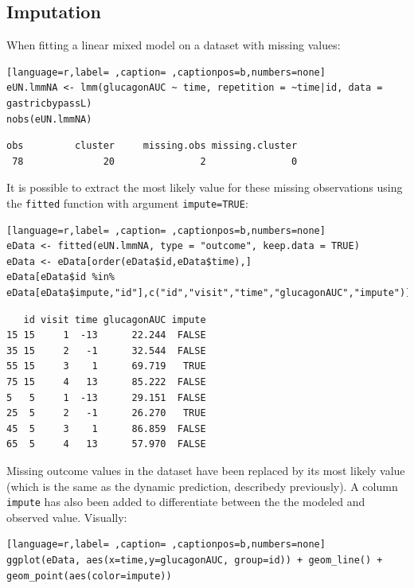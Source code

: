 \documentclass[12pt]{article}
\begin{document}
\subsection{Imputation}
\label{imputation}
When fitting a linear mixed model on a dataset with missing values:
\begin{lstlisting}[language=r,label= ,caption= ,captionpos=b,numbers=none]
eUN.lmmNA <- lmm(glucagonAUC ~ time, repetition = ~time|id, data = gastricbypassL)
nobs(eUN.lmmNA)
\end{lstlisting}

\begin{verbatim}
obs         cluster     missing.obs missing.cluster 
 78              20               2               0
\end{verbatim}


It is possible to extract the most likely value for these missing
observations using the \texttt{fitted} function with argument \texttt{impute=TRUE}:
\begin{lstlisting}[language=r,label= ,caption= ,captionpos=b,numbers=none]
eData <- fitted(eUN.lmmNA, type = "outcome", keep.data = TRUE)
eData <- eData[order(eData$id,eData$time),]
eData[eData$id %in% eData[eData$impute,"id"],c("id","visit","time","glucagonAUC","impute")]
\end{lstlisting}

\begin{verbatim}
   id visit time glucagonAUC impute
15 15     1  -13      22.244  FALSE
35 15     2   -1      32.544  FALSE
55 15     3    1      69.719   TRUE
75 15     4   13      85.222  FALSE
5   5     1  -13      29.151  FALSE
25  5     2   -1      26.270   TRUE
45  5     3    1      86.859  FALSE
65  5     4   13      57.970  FALSE
\end{verbatim}


Missing outcome values in the dataset have been replaced by its most
likely value (which is the same as the dynamic prediction, describedy
previously). A column \texttt{impute} has also been added to differentiate
between the the modeled and observed value. Visually:
\begin{lstlisting}[language=r,label= ,caption= ,captionpos=b,numbers=none]
ggplot(eData, aes(x=time,y=glucagonAUC, group=id)) + geom_line() + geom_point(aes(color=impute))
\end{lstlisting}
\end{document}
